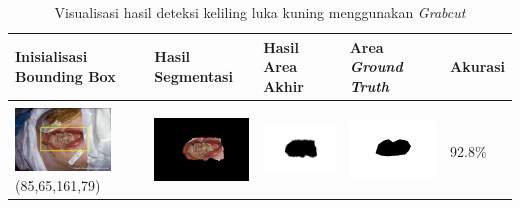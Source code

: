 \begin{table}[H]
	\centering
	\caption{Visualisasi hasil deteksi keliling luka kuning menggunakan \emph{Grabcut}}
	\label{tabel_hasil_8}
	\begin{tabular}{|m{1.0in}|m{1.0in}|m{1.0in}|m{1.0in}|m{0.6in}|}
		\hline
		\textbf{Inisialisasi Bounding Box} & \textbf{Hasil Segmentasi} & \textbf{Hasil Area Akhir} & \textbf{Area \emph{Ground Truth}} & \textbf{Akurasi} \\
		\hline
		
		&  &  & \\
		\includegraphics[width=1.0in]{gambar/hasil_segmentasi/luka_kuning/image_12_rect.jpg} {\centering\fontsize{10}{10}\selectfont(85,65,161,79)}&
		\includegraphics[width=1.0in]{gambar/hasil_segmentasi/luka_kuning/result_12.jpg}&
		\includegraphics[width=1.0in]{gambar/hasil_segmentasi/luka_kuning/mask_r_12.jpg}&
		\includegraphics[width=1.0in]{gambar/hasil_segmentasi/luka_kuning/12_r.jpg}&
		92.8\% \\
		\hline


\end{tabular}
\end{table}
